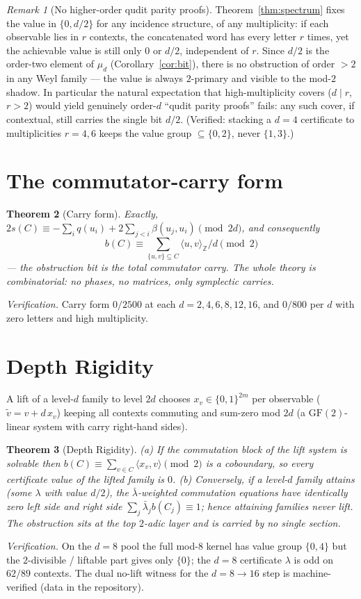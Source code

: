 \documentclass[11pt]{article}
\newtheorem{theorem}{Theorem}
\theoremstyle{remark}
\newtheorem{remark}[theorem]{Remark}
\newcommand{\Z}{\mathbb{Z}}
\newcommand{\ip}[2]{\langle #1,#2\rangle}
\newcommand{\ipz}[2]{\langle #1,#2\rangle_{\Z}}
\begin{document}
\begin{remark}[No higher-order qudit parity proofs]\label{rem:nohigher}
Theorem~\ref{thm:spectrum} fixes the value in $\{0,d/2\}$ for any incidence structure, of any
multiplicity: if each observable lies in $r$ contexts, the concatenated word has every letter $r$
times, yet the achievable value is still only $0$ or $d/2$, independent of $r$. Since $d/2$ is the
order-two element of $\mu_d$ (Corollary~\ref{cor:bit}), there is no obstruction of order $>2$ in any
Weyl family --- the value is always $2$-primary and visible to the mod-$2$ shadow. In particular the
natural expectation that high-multiplicity covers ($d\mid r$, $r>2$) would yield genuinely order-$d$
``qudit parity proofs'' fails: any such cover, if contextual, still carries the single bit $d/2$.
(Verified: stacking a $d=4$ certificate to multiplicities $r=4,6$ keeps the value group
$\subseteq\{0,2\}$, never $\{1,3\}$.)
\end{remark}

\section{The commutator-carry form}
\begin{theorem}[Carry form]\label{thm:carry}
Exactly, $2s(C)\equiv -\sum_i q(u_i)+2\sum_{j<i}\beta(u_j,u_i)\pmod{2d}$, and consequently
\[
b(C)\equiv\sum_{\{u,v\}\subseteq C}\ipz{u}{v}/d\pmod 2
\]
--- the obstruction bit is the total commutator carry. The whole theory is combinatorial: no phases,
no matrices, only symplectic carries.
\end{theorem}
\noindent\emph{Verification.} Carry form $0/2500$ at each $d=2,4,6,8,12,16$, and $0/800$ per $d$ with
zero letters and high multiplicity.

\section{Depth Rigidity}
A lift of a level-$d$ family to level $2d$ chooses $x_v\in\{0,1\}^{2m}$ per observable
($\tilde v=v+d\,x_v$) keeping all contexts commuting and sum-zero mod $2d$ (a $\mathrm{GF}(2)$-linear
system with carry right-hand sides).
\begin{theorem}[Depth Rigidity]\label{thm:depth}
(a) If the commutation block of the lift system is solvable then
$b(C)\equiv\sum_{v\in C}\ip{x_v}{v}\pmod 2$ is a coboundary, so every certificate value of the lifted
family is $0$. (b) Conversely, if a level-$d$ family attains (some $\lambda$ with value $d/2$), the
$\bar\lambda$-weighted commutation equations have identically zero left side and right side
$\sum_j\bar\lambda_j b(C_j)\equiv 1$; hence attaining families never lift. The obstruction sits at the
top $2$-adic layer and is carried by no single section.
\end{theorem}
\noindent\emph{Verification.} On the $d=8$ pool the full mod-$8$ kernel has value group $\{0,4\}$ but
the $2$-divisible / liftable part gives only $\{0\}$; the $d=8$ certificate $\lambda$ is odd on
$62/89$ contexts. The dual no-lift witness for the $d=8\to 16$ step is machine-verified (data in the
repository).
\end{document}
